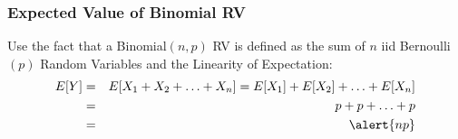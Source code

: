 %
% 
%
%
%
\begin{frame}
\frametitle{Expected Value of Binomial RV}

Use the fact that a Binomial$(n,p)$ RV is defined as the sum of $n$ iid Bernoulli$(p)$ Random Variables and the Linearity of Expectation:
\begin{eqnarray*}
E[Y] &=& E[X_1 + X_2 + \hdots + X_n] =  E[X_1] + E[X_2] + \hdots +E[X_n]\\
	&=& p + p + \hdots + p\\
	&=&  \alert{np}
\end{eqnarray*}
\vspace{3em}
\end{frame}

